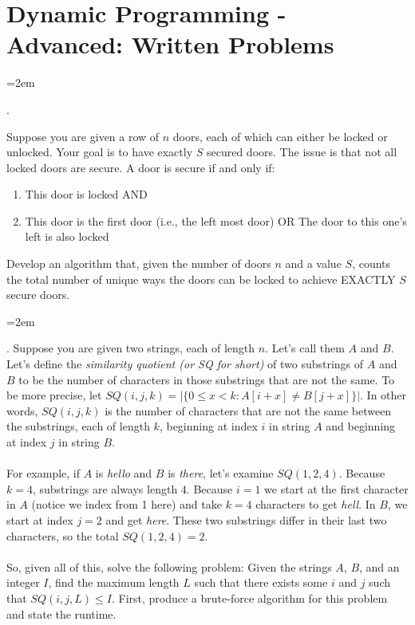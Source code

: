 \documentclass[12pt]{article}
\def\homework{Dynamic Programming - Advanced: Written Problems}
\newcounter{quesnum}
\newcommand{\question}[2][??]{
\begin{list}{\labelitemi}{\leftmargin=2em}
\item [\arabic{quesnum}.]  {#2}
\end{list}
\addtocounter{quesnum}{1}
}
\newcommand{\answer}[2][??]{ 
\ifthenelse{\boolean{solution}}{
\color{red} #2 \color{black}}
{\vspace*{#1}}
}
\begin{document}
\section*{\homework}



\question[3]{
Suppose you are given a row of $n$ doors, each of which can either be locked or unlocked. Your goal is to have exactly $S$ secured doors. The issue is that not all locked doors are secure. A door is secure if and only if:

\begin{enumerate}
\item This door is locked AND
\item This door is the first door (i.e., the left most door) OR The door to this one's left is also locked
\end{enumerate}

Develop an algorithm that, given the number of doors $n$ and a value $S$, counts the total number of unique ways the doors can be locked to achieve EXACTLY $S$ secure doors.
}

\answer[0 in]{
...
}


\question[3]{
Suppose you are given two strings, each of length $n$. Let's call them $A$ and $B$. Let's define the \emph{similarity quotient (or SQ for short)} of two substrings of $A$ and $B$ to be the number of characters in those substrings that are not the same. To be more precise, let $SQ(i,j,k) = |\{ 0 \leq x < k : A[i+x] \neq B[j+x] \}|$. In other words, $SQ(i,j,k)$ is the number of characters that are not the same between the substrings, each of length $k$, beginning at index $i$ in string $A$ and beginning at index $j$ in string $B$.\\
\\
For example, if $A$ is \emph{hello} and $B$ is \emph{there}, let's examine $SQ(1,2,4)$. Because $k=4$, substrings are always length $4$. Because $i=1$ we start at the first character in $A$ (notice we index from 1 here) and take $k=4$ characters to get \emph{hell}. In $B$, we start at index $j=2$ and get \emph{here}. These two substrings differ in their last two characters, so the total $SQ(1,2,4)=2$.\\
\\
So, given all of this, solve the following problem: Given the strings $A$, $B$, and an integer $I$, find the maximum length $L$ such that there exists some $i$ and $j$ such that $SQ(i,j,L) \leq I$. First, produce a brute-force algorithm for this problem and state the runtime.
}
\end{document}
